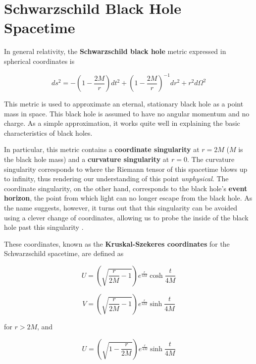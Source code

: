 \documentclass{article}
\begin{document}
\section{Schwarzschild Black Hole Spacetime}

In general relativity, the \textbf{Schwarzschild black hole} metric expressed in spherical coordinates is

\begin{equation}
    ds^{2} = -\left(1-\frac{2M}{r}\right)dt^{2} + \left(1-\frac{2M}{r}\right)^{-1}dr^{2} + r^{2}d\Omega^{2}
\end{equation}

This metric is used to approximate an eternal, stationary black hole as a point mass in space. This black hole is assumed to have no angular momentum and no charge. As a simple approximation, it works quite well in explaining the basic characteristics of black holes.

In particular, this metric contains a \textbf{coordinate singularity} at $r = 2M$ ($M$ is the black hole mass) and a \textbf{curvature singularity} at $r = 0$. The curvature singularity corresponds to where the Riemann tensor of this spacetime blows up to infinity, thus rendering our understanding of this point \textit{unphysical}. The coordinate singularity, on the other hand, corresponds to the black hole's \textbf{event horizon}, the point from which light can no longer escape from the black hole. As the name suggests, however, it turns out that this singularity can be avoided using a clever change of coordinates, allowing us to probe the inside of the black hole past this singularity \cite{schutz}.

These coordinates, known as the \textbf{Kruskal-Szekeres coordinates} for the Schwarzschild spacetime, are defined as \cite{schutz}\cite{tikz_penrose}

\begin{equation}
    U = \left(\sqrt{\frac{r}{2M} - 1}\right)e^{\frac{r}{4M}}\cosh{\frac{t}{4M}}
\end{equation}

\begin{equation}
    V = \left(\sqrt{\frac{r}{2M} - 1}\right)e^{\frac{r}{4M}}\sinh{\frac{t}{4M}}
\end{equation}

for $r > 2M$, and

\begin{equation}
    U = \left(\sqrt{1 - \frac{r}{2M}}\right)e^{\frac{r}{4M}}\sinh{\frac{t}{4M}}
\end{equation}
\end{document}
